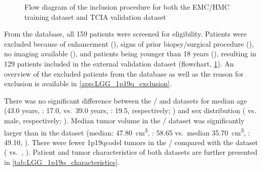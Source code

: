 \begin{figure}
\centering

\caption{Flow diagram of the inclusion procedure for both the \acrshort{EMC}/\acrshort{HMC} training dataset and \acrshort{TCIA} validation dataset}\label{fig:LGG_1p19q_flowchart}
\end{figure}


From the  database, all 159 patients were screened for eligibility.
Patients were excluded because of enhancement (), signs of prior biopsy/surgical procedure (), no  imaging available (), and patients being younger than 18 years (), resulting in 129 patients included in the external validation dataset (flowchart, \cref{fig:LGG_1p19q_flowchart}).
An overview of the excluded patients from the  database as well as the reason for exclusion is available in \cref{app:LGG_1p19q_exclusion}.

There was no significant difference between the / and  datasets for median age (\num{43.0} years, : \num{17.0}, vs.\ \num{39.0} years, : \num{19.5}, respectively; ) and sex distribution ( vs.\  male, respectively; ).
Median \gls{tumor} volume in the / dataset was significantly larger than in the  dataset (median: \SI{47.80}{\centi\meter\cubed}, : \num{58.65} vs.\ median \SI{35.70}{\centi\meter\cubed}, : \num{49.10}, ).
There were fewer \acl{1p19qcodel} \glspl{tumor} in the / compared with the  dataset ( vs.\ , ).
Patient and \gls{tumor} characteristics of both datasets are further presented in \cref{tab:LGG_1p19q_characteristics}.

